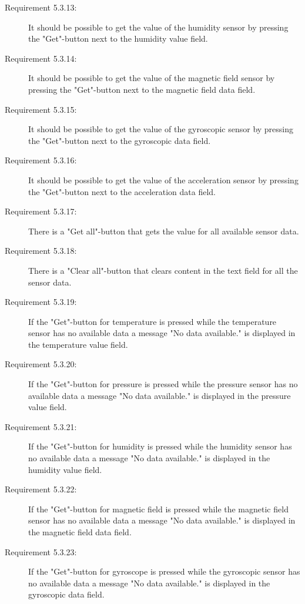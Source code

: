 \documentclass[a4paper]{article}
\begin{document}
\begin{description}
\item[Requirement 5.3.13:] It should be possible to get the value of the humidity sensor by pressing the "Get"-button next to the humidity value field.

\item[Requirement 5.3.14:] It should be possible to get the value of the magnetic field sensor by pressing the "Get"-button next to the magnetic field data field.

\item[Requirement 5.3.15:] It should be possible to get the value of the gyroscopic sensor by pressing the "Get"-button next to the gyroscopic data field.

\item[Requirement 5.3.16:] It should be possible to get the value of the acceleration sensor by pressing the "Get"-button next to the acceleration data field.

\item[Requirement 5.3.17:] There is a "Get all"-button that gets the value for all available sensor data.

\item[Requirement 5.3.18:] There is a "Clear all"-button that clears content in the text field for all the sensor data.

\item[Requirement 5.3.19:] If the "Get"-button for temperature is pressed while the temperature sensor has no available data a message "No data available." is displayed in the temperature value field.

\item[Requirement 5.3.20:] If the "Get"-button for pressure is pressed while the pressure sensor has no available data a message "No data available." is displayed in the pressure value field.

\item[Requirement 5.3.21:] If the "Get"-button for humidity is pressed while the humidity sensor has no available data a message "No data available." is displayed in the humidity value field.

\item[Requirement 5.3.22:] If the "Get"-button for magnetic field is pressed while the magnetic field sensor has no available data a message "No data available." is displayed in the magnetic field data field.

\item[Requirement 5.3.23:] If the "Get"-button for gyroscope is pressed while the gyroscopic sensor has no available data a message "No data available." is displayed in the gyroscopic data field.


\end{description}
\end{document}
